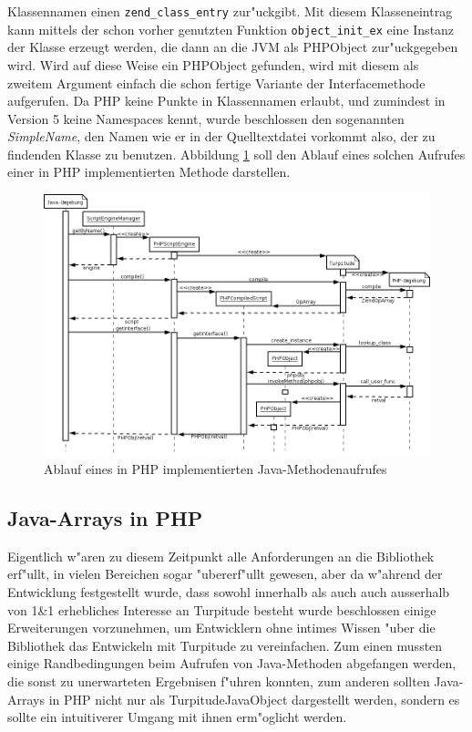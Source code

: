 Klassennamen einen \texttt{zend\_class\_entry} zur"uckgibt. Mit diesem Klasseneintrag kann mittels der schon vorher genutzten Funktion \texttt{object\_init\_ex}
eine Instanz der Klasse erzeugt werden, die dann an die JVM als PHPObject zur"uckgegeben wird. Wird auf diese Weise ein PHPObject gefunden, wird mit diesem
als zweitem Argument einfach die schon fertige Variante der Interfacemethode aufgerufen. Da PHP keine Punkte in Klassennamen erlaubt, und zumindest in
Version 5 keine Namespaces kennt, wurde beschlossen den sogenannten \emph{SimpleName}, den Namen wie er in der Quelltextdatei vorkommt also, der zu findenden Klasse 
zu benutzen. Abbildung \ref{fig:javaseq} soll den Ablauf eines solchen Aufrufes einer in PHP implementierten Methode darstellen. 

\begin{figure}[h]
\includegraphics[width=\textwidth]{chap1/img/javaseq.png}
\caption{Ablauf eines in PHP implementierten Java-Methodenaufrufes}
\label{fig:javaseq}
\end{figure}

\subsection{Java-Arrays in PHP}
\label{sec:chap1:impl:11}

Eigentlich w"aren zu diesem Zeitpunkt alle Anforderungen an die Bibliothek erf"ullt, in vielen Bereichen sogar "ubererf"ullt gewesen, aber da w"ahrend
der Entwicklung festgestellt wurde, dass sowohl innerhalb als auch auch ausserhalb von 1\&1 erhebliches Interesse an Turpitude besteht wurde beschlossen 
einige Erweiterungen vorzunehmen, um Entwicklern ohne intimes Wissen "uber die Bibliothek das Entwickeln mit Turpitude zu vereinfachen.
Zum einen mussten einige Randbedingungen beim Aufrufen von Java-Methoden abgefangen werden, die sonst zu unerwarteten Ergebnisen f"uhren konnten, zum
anderen sollten Java-Arrays in PHP nicht nur als TurpitudeJavaObject dargestellt werden, sondern es sollte ein intuitiverer Umgang mit ihnen erm"oglicht werden.

